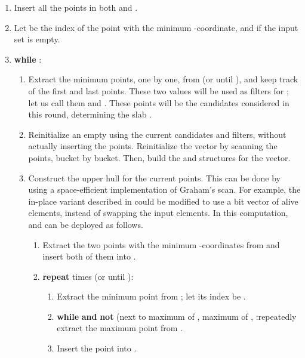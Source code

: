 \documentclass[final,onetabnum,onefignum,onethmnum]{siamltex}
\newcommand{\Rank}{\mbox{}}
\newcommand{\Select}{\mbox{}}
\newcommand{\MinOne}{\mbox{}}
\newcommand{\MinTwo}{\mbox{}}
\newcommand{\MaxPile}{\mbox{}}
\begin{document}
\begin{enumerate}

\item
Insert all the  points in both \MinOne{} and \MinTwo{}.
\item
Let  be the index of the point with the minimum -coordinate, and  if the input set is empty.
\item
\textbf{while} :

\begin{enumerate}

\item Extract the minimum  points, one by one, from \MinOne{} (or
  until ), and keep track of the first and last points. 
  These two values will be used as filters for \MaxPile{}; let us call them 
   and . These  points will be the candidates considered in this round, 
  determining the slab .

\item Reinitialize an empty \MaxPile{} using the current candidates and filters, 
  without actually inserting the points. Reinitialize the
   vector by scanning the  points, bucket by
  bucket. Then, build the \Rank{} and \Select{} structures for the
   vector.

\item
\label{critical-piece}
 Construct the upper hull for the current  points. This can be
  done by using a space-efficient implementation of Graham's scan. For
  example, the in-place variant described in \cite{BIKMMT04} could be
  modified to use a bit vector of alive elements, instead of swapping
  the input elements. In this computation, \MaxPile{} and \MinTwo{}
  can be deployed as follows.

\begin{enumerate}
\item Extract the two points with the minimum -coordinates 
from \MinTwo{} and insert both of them into \MaxPile{}.
\item \textbf{repeat}  times (or until ): 
\begin{enumerate}
\item Extract the minimum point from \MinTwo{}; let its index be .
\item \textbf{while}  
  \textbf{and} \textbf{not} (next to maximum of \MaxPile{},  maximum of \MaxPile{}, :\newline \hspace*{1.25em}repeatedly extract the maximum point from \MaxPile{}.
\item Insert the point  into \MaxPile{}.
\end{enumerate}
\end{enumerate}


\end{enumerate}
\end{enumerate}
\end{document}
